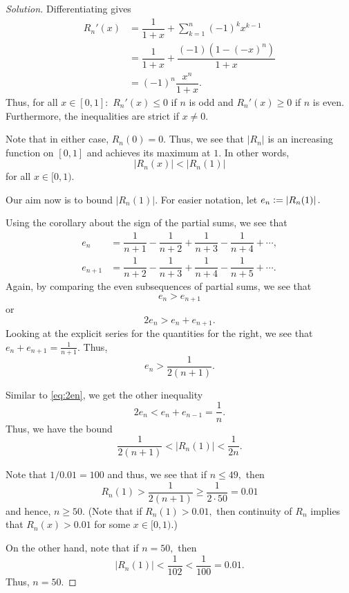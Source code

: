\documentclass[12pt]{article}
\theoremstyle{definition}
\newenvironment{soln}{\begin{proof}[Solution]}{\end{proof}}
\newcommand{\md}[1]{\left\lvert #1 \right\lvert}
\begin{document}
\begin{soln}
	Differentiating gives
	\begin{align*} 
		R_n'(x) &= \dfrac{1}{1 + x} + \sum_{k = 1}^{n}(-1)^kx^{k-1}\\
		&= \dfrac{1}{1 + x} + \dfrac{(-1)(1 - (-x)^n)}{1 + x}\\
		&= (-1)^n\dfrac{x^n}{1 + x}.
	\end{align*}
	Thus, for all $x \in [0, 1]:$ $R_n'(x) \le 0$ if $n$ is odd and $R_n'(x) \ge 0$ if $n$ is even. Furthermore, the inequalities are strict if $x \neq 0.$

	Note that in either case, $R_n(0) = 0.$ Thus, we see that $\md{R_n}$ is an increasing function on $[0, 1]$ and achieves its maximum at $1.$ In other words,
	\begin{equation*} 
		\md{R_n(x)} < \md{R_n(1)}
	\end{equation*}
	for all $x \in [0, 1).$

	Our aim now is to bound $\md{R_n(1)}.$ For easier notation, let $e_n \vcentcolon= \md{R_n(1)}.$

	Using the corollary about the sign of the partial sums, we see that
	\begin{align*} 
		e_n &= \dfrac{1}{n + 1} - \dfrac{1}{n + 2} + \dfrac{1}{n + 3} - \dfrac{1}{n + 4} + \cdots,\\
		e_{n+1} &= \dfrac{1}{n + 2} - \dfrac{1}{n + 3} + \dfrac{1}{n + 4} - \dfrac{1}{n + 5} + \cdots.
	\end{align*}
	Again, by comparing the even subsequences of partial sums, we see that
	\begin{equation*} 
		e_{n} > e_{n + 1}
	\end{equation*}
	or
	\begin{equation} \tag{$*$} \label{eq:2en}
		2e_{n} > e_n + e_{n + 1}.
	\end{equation}
	Looking at the explicit series for the quantities for the right, we see that $e_n + e_{n + 1} = \frac{1}{n + 1}.$ Thus,
	\begin{equation*} 
		e_n > \dfrac{1}{2(n + 1)}.
	\end{equation*}

	Similar to \cref{eq:2en}, we get the other inequality
	\begin{equation*} 
		2e_{n} < e_n + e_{n-1} = \dfrac{1}{n}.
	\end{equation*}
	Thus, we have the bound
	\begin{equation*} 
		\dfrac{1}{2(n + 1)} < \md{R_n(1)} < \dfrac{1}{2n}.
	\end{equation*}

	Note that $1/0.01 = 100$ and thus, we see that if $n \le 49,$ then 
	\begin{equation*} 
		R_{n}(1) > \dfrac{1}{2(n + 1)} \ge \dfrac{1}{2\cdot50} = 0.01
	\end{equation*} and hence, $n \ge 50.$ (Note that if $R_n(1) > 0.01,$ then continuity of $R_n$ implies that $R_n(x) > 0.01$ for some $x \in [0, 1)$.)

	On the other hand, note that if $n = 50,$ then
	\begin{equation*} 
		\md{R_{n}(1)} < \dfrac{1}{102} < \dfrac{1}{100} = 0.01.
	\end{equation*}
	Thus, $n = 50.$
\end{soln}
\end{document}
